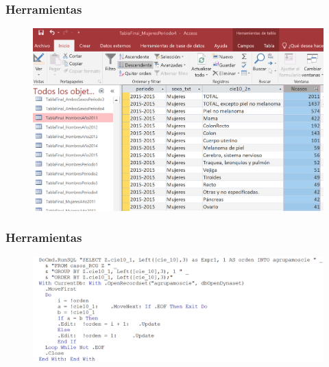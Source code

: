 \documentclass{beamer}
\begin{document}

\begin{frame}\frametitle{Herramientas}
	\begin{figure}
		\centering
		\includegraphics[width=.9\textwidth]{images/access1.png}
	\end{figure}
\end{frame}


\begin{frame}\frametitle{Herramientas}
	\begin{figure}
		\centering
		\includegraphics[width=.9\textwidth]{images/access2.png}
	\end{figure}
\end{frame}

\end{document}
